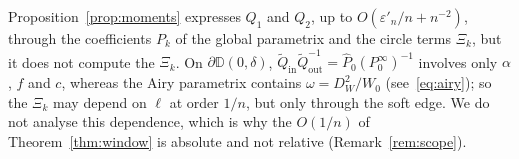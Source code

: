 \begin{remark}\label{rem:circle-terms}
Proposition~\ref{prop:moments} expresses $Q_1$ and $Q_2$, up to $O(\varepsilon'_n/n+n^{-2})$, through the coefficients
$P_k$ of the global parametrix and the circle terms $\Xi_k$, but it does not compute the $\Xi_k$. On $\partial \mathbb D(0,\delta)$,
$\tilde Q_{\mathrm{in}}\tilde Q_{\mathrm{out}}^{-1}=\hat P_0(P^\infty_0)^{-1}$ involves only $\alpha$, $f$ and $c$,
whereas the Airy parametrix contains $\omega=D_W^2/W_0$ (see~\eqref{eq:airy}); so the $\Xi_k$ may depend on $\ell$ at order $1/n$,
but only through the soft edge. We do not analyse this dependence, which is why the $O(1/n)$ of
Theorem~\ref{thm:window} is absolute and not relative (Remark~\ref{rem:scope}).
\end{remark}
